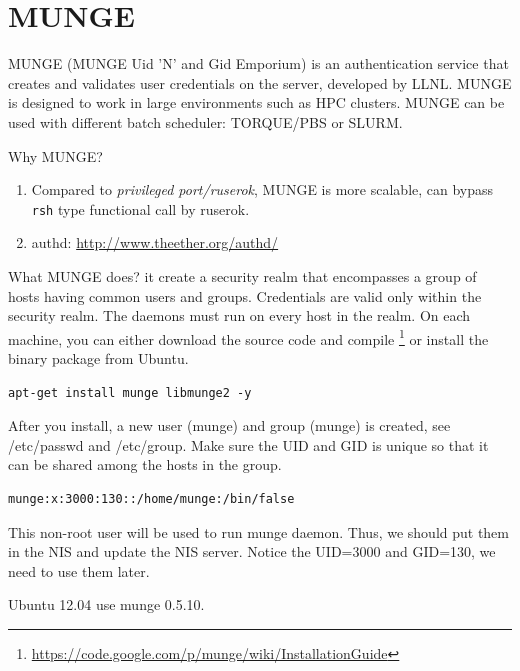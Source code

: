 \section{MUNGE}
\label{sec:MUNGE}

MUNGE (MUNGE Uid 'N' and Gid Emporium) is an authentication service that creates
and validates user credentials on the server, developed by LLNL. MUNGE is
designed to work in large environments such as HPC clusters. MUNGE can be used with different batch
scheduler: TORQUE/PBS or SLURM. 

Why MUNGE?
\begin{enumerate}
  \item Compared to {\it privileged port/ruserok}, MUNGE is more scalable, can
  bypass \verb!rsh! type functional call by ruserok.
  \item  authd: \url{http://www.theether.org/authd/}
\end{enumerate}

What MUNGE does? it create a security realm that encompasses a group of hosts
having common users and groups. Credentials are valid only within the security
realm. The daemons must run on every host in the realm. On each machine, you can
either download the source code and compile
\footnote{\url{https://code.google.com/p/munge/wiki/InstallationGuide}} or
install the binary package from Ubuntu.
\begin{verbatim}
apt-get install munge libmunge2 -y
\end{verbatim}
After you install, a new user (munge) and group (munge) is created, see
/etc/passwd and /etc/group. Make sure the UID and GID is unique so that it can
be shared among the hosts in the group.
\begin{verbatim}
munge:x:3000:130::/home/munge:/bin/false
\end{verbatim}
This non-root user will be used to run munge daemon. Thus, we should put them in
the NIS and update the NIS server. Notice the UID=3000 and GID=130, we need to
use them later.

\begin{mdframed}
Ubuntu 12.04 use munge 0.5.10.
\end{mdframed}

